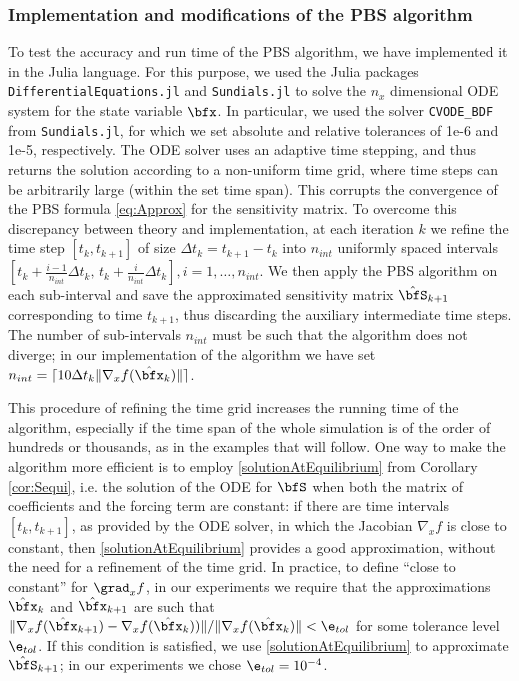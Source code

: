 \documentclass[DIV=12]{scrartcl} %
\newcommand{\BDF}{\texttt{CVODE\_BDF}}
\theoremstyle{definition}
\begin{document}
\subsubsection*{Implementation and modifications of the PBS algorithm}
To test the accuracy and run time of the PBS algorithm, we have implemented it in the Julia language. For this purpose, we used the Julia packages \texttt{DifferentialEquations.jl} and \texttt{Sundials.jl} to solve the $n_x$ dimensional ODE system for the state variable $\bfx$. In particular, we used the solver \BDF \, from \texttt{Sundials.jl}, for which we set absolute and relative tolerances of 1e-6 and 1e-5, respectively. The ODE solver uses an adaptive time stepping, and thus returns the solution according to a non-uniform time grid, where time steps can be arbitrarily large (within the set time span). This corrupts the convergence of the PBS formula \eqref{eq:Approx} for the sensitivity matrix. To overcome this discrepancy between theory and implementation, at each iteration $k$ we refine the time step $[t_k,t_{k+1}]$ of size $\Delta t_k = t_{k+1}-t_k$ into $n_{int}$ uniformly spaced intervals $[t_k+\frac{i-1}{n_{int}}\Delta t_k,\,t_k+\frac{i}{n_{int}}\Delta t_k], i=1,\dots,n_{int}$. We then apply the PBS algorithm on each sub-interval and save the approximated sensitivity matrix $\hat{\bfS}_{k+1}$ corresponding to time $t_{k+1}$, thus discarding the auxiliary intermediate time steps. The number of sub-intervals $n_{int}$ must be such that the algorithm does not diverge; in our implementation of the algorithm we have set $n_{int}=\lceil 10\Delta t_k \|\nabla_xf(\hat{\bfx}_k)\| \rceil$.

This procedure of refining the time grid increases the running time of the algorithm, especially if the time span of the whole simulation is of the order of hundreds or thousands, as in the examples that will follow. One way to make the algorithm more efficient is to employ \eqref{solutionAtEquilibrium} from Corollary \ref{cor:Sequi}, i.e. the solution of the ODE for $\bfS$ when both the matrix of coefficients and the forcing term are constant: if there are time intervals $[t_k,t_{k+1}]$, as provided by the  ODE solver, in which the Jacobian $\nabla_xf$ is close to constant, then \eqref{solutionAtEquilibrium} provides a good approximation, without the need for a refinement of the time grid. In practice, to define ``close to constant'' for $\grad _x f$, in our experiments we require that the approximations $\hat{\bfx}_k$ and $\hat{\bfx}_{k+1}$ are such that $\|\nabla_xf(\hat{\bfx}_{k+1})-\nabla_xf(\hat{\bfx}_k))\|/\|\nabla_xf(\hat{\bfx}_k)\|< \e _{tol}$ for some tolerance level $\e _{tol}$. If this condition is satisfied, we use \eqref{solutionAtEquilibrium} to approximate $\hat{\bfS}_{k+1}$; in our experiments we chose $\e _{tol}=10^{-4}$.
\end{document}
